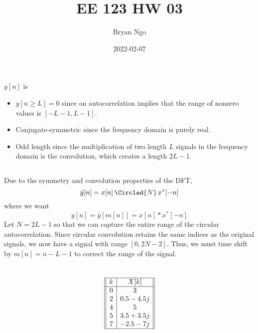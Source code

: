 \documentclass{article}
\title{EE 123 HW 03}
\author{Bryan Ngo}
\date{2022-02-07}
\begin{document}
\maketitle

\setcounter{section}{2}

\section{}

\subsection{}

\(y[n]\) is
\begin{itemize}
    \item \(y[n \geqslant L] = 0\) since an autocorrelation implies that the range of nonzero values is \([-L - 1, L - 1]\).
    \item Conjugate-symmetric since the frequency domain is purely real.
    \item Odd length since the multiplication of two length \(L\) signals in the frequency domain is the convolution, which creates a length \(2L - 1\).
\end{itemize}

\subsection{}

Due to the symmetry and convolution properties of the DFT,
\begin{equation}
    \bar{y}[n] = x[n] \, \Circled{N} \, x^\ast[-n]
\end{equation}
where we want
\begin{equation}
    y[n] = \bar{y}[m[n]] = x[n] \ast x^\ast[-n]
\end{equation}
Let \(N = 2L - 1\) so that we can capture the entire range of the circular autocorrelation.
Since circular convolution retains the same indices as the original signals, we now have a signal with range \([0, 2N - 2]\).
Thus, we must time shift by \(m[n] = n - L - 1\) to correct the range of the signal.

\newpage
\section{}

\begin{equation}
    \begin{array}[]{||c|c||}
        \hline
        k & X[k] \\
        \hline
        0 & 3 \\
        2 & 0.5 - 4.5j \\
        4 & 5 \\
        5 & 3.5 + 3.5j \\
        7 & -2.5 - 7j \\
        \hline
    \end{array}
\end{equation}
\end{document}
